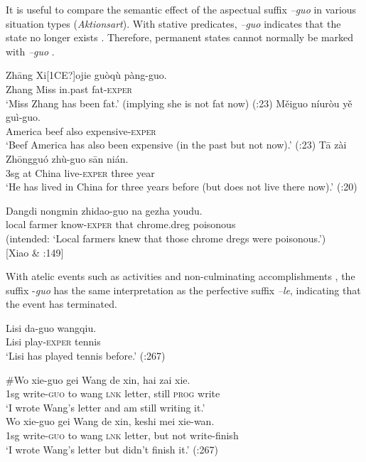It is useful to compare the semantic effect of the aspectual suffix \textit{–guo} in various situation types (\textit{Aktionsart}). With stative predicates, \textit{–guo} indicates that the state no longer exists . Therefore, permanent states cannot normally be marked with \textit{–guo} .


\ea
\ea \gll  Zh\=ang  Xi[1CE?]ojie  guòqù  pàng-guo.\\
Zhang  Miss  in.past  fat-\textsc{exper}\\
\glt ‘Miss Zhang has been fat.’ (implying she is not fat now)  (\citealt{Ma1977}:23)
\ex \gll Měiguo  níuròu  yě  guì-guo.\\
America  beef  also  expensive-\textsc{exper}\\
\glt ‘Beef America has also been expensive (in the past but not now).’  (\citealt{Ma1977}:23)
\ex \gll  T\=a  zài  Zh\=ongguó  zhù-guo  s\=an  nián.\\
3sg  at  China  live-\textsc{exper} three  year\\
\glt ‘He has lived in China for three years before (but does not live there now).’  (\citealt{Ma1977}:20)
\z \z

\ea
\gll *Dangdi  nongmin  zhidao-guo  na  gezha  youdu.\\
  local  farmer  know-\textsc{exper}  that  chrome.dreg  poisonous\\
\glt (intended: ‘Local farmers knew that those chrome dregs were poisonous.’)\\
   {}[Xiao \& \citealt{McEnery2004}:149]
\z


With atelic events such as activities  and non-culminating accomplishments , the suffix -\textit{guo} has the same interpretation as the perfective suffix \textit{–le}, indicating that the event has terminated.


\ea
\gll Lisi  da-guo  wangqiu.\\
Lisi  play-\textsc{exper}  tennis\\
\glt ‘Lisi has played tennis before.’  (\citealt{Smith1997}:267)
\z

\ea
\ea \gll \#Wo  xie-guo  gei  Wang  de  xin,  hai  zai  xie.\\
 1sg  write-\textsc{guo}  to  wang  \textsc{lnk} letter,  still  \textsc{prog}  write\\
\glt ‘I wrote Wang’s letter and am still writing it.’\\
\ex \gll  Wo  xie-guo  gei  Wang  de  xin,  keshi  mei  xie-wan.\\
1sg  write-\textsc{guo}  to  wang  \textsc{lnk} letter,  but  not  write-finish\\
\glt ‘I wrote Wang’s letter but didn’t finish it.’  (\citealt{Smith1997}:267)
\z \z



